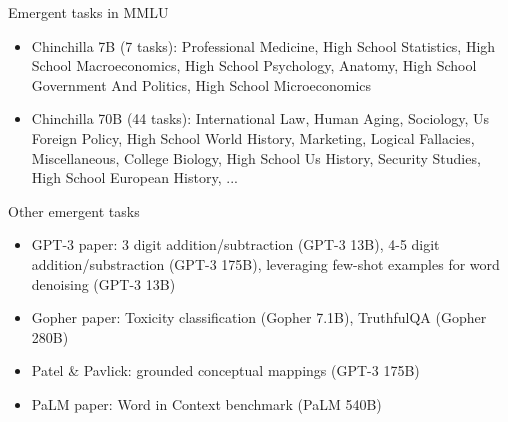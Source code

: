 
\begin{frame}{Emergent tasks in MMLU}

\vfill

\begin{itemize}
    \item Chinchilla 7B (7 tasks): Professional Medicine, High School Statistics, High School Macroeconomics, High School Psychology, Anatomy, High School Government And Politics, High School Microeconomics
    \item Chinchilla 70B (44 tasks): International Law, Human Aging, Sociology, Us Foreign Policy, High School World History, Marketing, Logical Fallacies, Miscellaneous, College Biology, High School Us History, Security Studies, High School European History, ...
\end{itemize}

\vfill

\end{frame}


\begin{frame}{Other emergent tasks}

\vfill

\begin{itemize}
    \item GPT-3 paper: 3 digit addition/subtraction (GPT-3 13B), 4-5 digit addition/substraction (GPT-3 175B), leveraging few-shot examples for word denoising (GPT-3 13B)
    \item Gopher paper: Toxicity classification (Gopher 7.1B), TruthfulQA (Gopher 280B)
    \item Patel \& Pavlick: grounded conceptual mappings (GPT-3 175B)
    \item PaLM paper: Word in Context benchmark (PaLM 540B)
\end{itemize}

\vfill

\end{frame}






